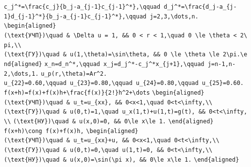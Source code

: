 \documentclass[
  ukrainian,
]{article}
\begin{document}
\texttt{c\_j\^{}*=\textbackslash{}frac\{c\_j\}\{b\_j-a\_\{j-1\}c\_\{j-1\}\^{}*\},\textbackslash{}qquad\ d\_j\^{}*=\textbackslash{}frac\{d\_j-a\_\{j-1\}d\_\{j-1\}\^{}*\}\{b\_j-a\_\{j-1\}c\_\{j-1\}\^{}*\},\textbackslash{}qquad\ j=2,3,\textbackslash{}dots,n.}
\texttt{\textbackslash{}begin\{aligned\}(\textbackslash{}text\{УЧП\})\textbackslash{}quad\ \&\ \textbackslash{}Delta\ u\ =\ 1,\ \&\&\ 0\ \textless{}\ r\ \textless{}\ 1,\textbackslash{}quad\ 0\ \textbackslash{}le\ \textbackslash{}theta\ \textless{}\ 2\textbackslash{}pi,\textbackslash{}\textbackslash{}(\textbackslash{}text\{ГУ\})\textbackslash{}quad\ \&\ u(1,\textbackslash{}theta)=\textbackslash{}sin\textbackslash{}theta,\ \&\&\ 0\ \textbackslash{}le\ \textbackslash{}theta\ \textbackslash{}le\ 2\textbackslash{}pi.\textbackslash{}end\{aligned\}}
\texttt{x\_n=d\_n\^{}*,\textbackslash{}qquad\ x\_j=d\_j\^{}*-c\_j\^{}*x\_\{j+1\},\textbackslash{}qquad\ j=n-1,n-2,\textbackslash{}dots,1.}
\texttt{u\_p(r,\textbackslash{}theta)=Ar\^{}2.}
\texttt{u\_\{22\}=0.60,\textbackslash{}qquad\ u\_\{23\}=0.80,\textbackslash{}qquad\ u\_\{24\}=0.80,\textbackslash{}qquad\ u\_\{25\}=0.60.}
\texttt{f(x+h)=f(x)+f\textquotesingle{}(x)h+\textbackslash{}frac\{f\textquotesingle{}\textquotesingle{}(x)\}\{2!\}h\^{}2+\textbackslash{}dots}
\texttt{\textbackslash{}begin\{aligned\}}
\texttt{(\textbackslash{}text\{УЧП\})\textbackslash{}quad\ \&\ u\_t=u\_\{xx\},\ \&\&\ 0\textless{}x\textless{}1,\textbackslash{}quad\ 0\textless{}t\textless{}\textbackslash{}infty,\textbackslash{}\textbackslash{}}
\texttt{(\textbackslash{}text\{ГУ\})\textbackslash{}quad\ \&\ u(0,t)=1,\textbackslash{}quad\ u\_x(1,t)+u(1,t)=g(t),\ \&\&\ 0\textless{}t\textless{}\textbackslash{}infty,\textbackslash{}\textbackslash{}}
\texttt{(\textbackslash{}text\{НУ\})\textbackslash{}quad\ \&\ u(x,0)=0,\ \&\&\ 0\textbackslash{}le\ x\textbackslash{}le\ 1.}
\texttt{\textbackslash{}end\{aligned\}}
\texttt{f(x+h)\textbackslash{}cong\ f(x)+f\textquotesingle{}(x)h,}
\texttt{\textbackslash{}begin\{aligned\}}
\texttt{(\textbackslash{}text\{УЧП\})\textbackslash{}quad\ \&\ u\_t=u\_\{xx\}+u,\ \&\&\ 0\textless{}x\textless{}1,\textbackslash{}quad\ 0\textless{}t\textless{}\textbackslash{}infty,\textbackslash{}\textbackslash{}}
\texttt{(\textbackslash{}text\{ГУ\})\textbackslash{}quad\ \&\ u(0,t)=0,\textbackslash{}quad\ u(1,t)=0,\ \&\&\ 0\textless{}t\textless{}\textbackslash{}infty,\textbackslash{}\textbackslash{}}
\texttt{(\textbackslash{}text\{НУ\})\textbackslash{}quad\ \&\ u(x,0)=\textbackslash{}sin(\textbackslash{}pi\ x),\ \&\&\ 0\textbackslash{}le\ x\textbackslash{}le\ 1.}
\texttt{\textbackslash{}end\{aligned\}}
\end{document}
